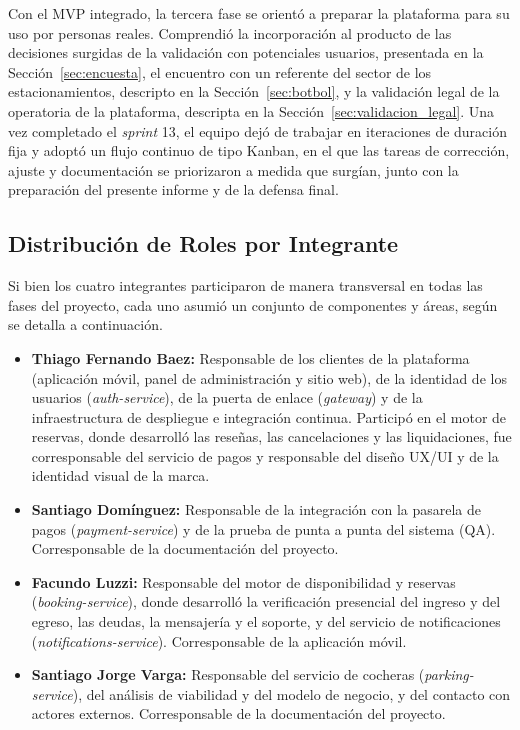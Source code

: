 Con el MVP integrado, la tercera fase se orientó a preparar la plataforma para su uso por personas reales. Comprendió la incorporación al producto de las decisiones surgidas de la validación con potenciales usuarios, presentada en la Sección~\ref{sec:encuesta}, el encuentro con un referente del sector de los estacionamientos, descripto en la Sección~\ref{sec:botbol}, y la validación legal de la operatoria de la plataforma, descripta en la Sección~\ref{sec:validacion_legal}. Una vez completado el \textit{sprint} 13, el equipo dejó de trabajar en iteraciones de duración fija y adoptó un flujo continuo de tipo Kanban, en el que las tareas de corrección, ajuste y documentación se priorizaron a medida que surgían, junto con la preparación del presente informe y de la defensa final.

\subsection{Distribución de Roles por Integrante}\label{sec:roles}

Si bien los cuatro integrantes participaron de manera transversal en todas las fases del proyecto, cada uno asumió un conjunto de componentes y áreas, según se detalla a continuación.

\begin{itemize}
    \item \textbf{Thiago Fernando Baez:} Responsable de los clientes de la plataforma (aplicación móvil, panel de administración y sitio web), de la identidad de los usuarios (\textit{auth-service}), de la puerta de enlace (\textit{gateway}) y de la infraestructura de despliegue e integración continua. Participó en el motor de reservas, donde desarrolló las reseñas, las cancelaciones y las liquidaciones, fue corresponsable del servicio de pagos y responsable del diseño UX/UI y de la identidad visual de la marca.
    \item \textbf{Santiago Domínguez:} Responsable de la integración con la pasarela de pagos (\textit{payment-service}) y de la prueba de punta a punta del sistema (QA). Corresponsable de la documentación del proyecto.
    \item \textbf{Facundo Luzzi:} Responsable del motor de disponibilidad y reservas (\textit{booking-service}), donde desarrolló la verificación presencial del ingreso y del egreso, las deudas, la mensajería y el soporte, y del servicio de notificaciones (\textit{notifications-service}). Corresponsable de la aplicación móvil.
    \item \textbf{Santiago Jorge Varga:} Responsable del servicio de cocheras (\textit{parking-service}), del análisis de viabilidad y del modelo de negocio, y del contacto con actores externos. Corresponsable de la documentación del proyecto.
\end{itemize}

